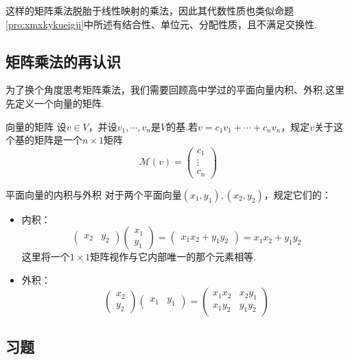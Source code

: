 \documentclass[lang=cn, zihao=5]{elegantbook}
\newcommand{\mmatrix}{\mathcal{M}}
\begin{document}
这样的矩阵乘法脱胎于线性映射的乘法，因此其代数性质也类似命题\ref{pro:xmxkykueigji}中所述有结合性、单位元、分配性质，且不满足交换性.

\subsection{矩阵乘法的再认识}

为了换个角度思考矩阵乘法，我们需要回顾高中学过的平面向量内积、外积.这里先定义一个向量的矩阵.

\begin{definition}{向量的矩阵}
	设$v \in V$，并设$v_1, \cdots ,v_n$是$V$的基.若$v=c_1v_1 + \cdots + c_nv_n$，规定$v$关于这个基的矩阵是一个$n \times 1$矩阵$$\mmatrix(v) = \begin{pmatrix}
		c_1 \\ \vdots \\ c_n
	\end{pmatrix}$$
\end{definition}

\begin{definition}{平面向量的内积与外积}
	对于两个平面向量$(x_1,y_1),(x_2,y_2)$，规定它们的：
	\begin{itemize}
		\item 内积：$$\begin{pmatrix}
			x_2 & y_2
		\end{pmatrix} \begin{pmatrix}
			x_1 \\ y_1
		\end{pmatrix} = \begin{pmatrix}
			x_1x_2+y_1y_2
		\end{pmatrix} = x_1x_2+y_1y_2$$
		这里将一个$1 \times 1$矩阵视作与它内部唯一的那个元素相等.
		\item 外积：$$\begin{pmatrix}
		x_2 \\ y_2 \end{pmatrix} \begin{pmatrix}
			x_1 & y_1 \end{pmatrix} = \begin{pmatrix}
				x_1x_2 & x_2y_1 \\ x_1y_2 & y_1y_2
			\end{pmatrix}$$
	\end{itemize}
\end{definition}

\subsection*{习题}
\end{document}
